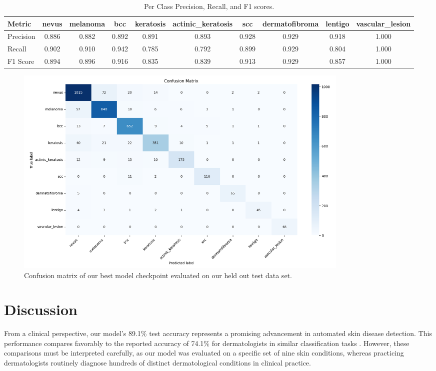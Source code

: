 \documentclass{article} %
\begin{document}
\begin{table}[H]
\caption{Per Class Precision, Recall, and F1 scores.}
\label{per-class-results}
\begin{center}
\scriptsize
\begin{tabular}{|l|c|c|c|c|c|c|c|c|c|}
\hline
\textbf{Metric} & \textbf{nevus} & \textbf{melanoma} & \textbf{bcc} & \textbf{keratosis} & \textbf{actinic\_keratosis} & \textbf{scc} & \textbf{dermatofibroma} & \textbf{lentigo} & \textbf{vascular\_lesion} \\
\hline
Precision & 0.886 & 0.882 & 0.892 & 0.891 & 0.893 & 0.928 & 0.929 & 0.918 & 1.000 \\
\hline
Recall & 0.902 & 0.910 & 0.942 & 0.785 & 0.792 & 0.899 & 0.929 & 0.804 & 1.000 \\
\hline
F1 Score & 0.894 & 0.896 & 0.916 & 0.835 & 0.839 & 0.913 & 0.929 & 0.857 & 1.000 \\
\hline
\end{tabular}
\end{center}
\end{table}

\begin{figure}[H]
\begin{center}
\includegraphics[width=0.8\textwidth]{Figs/test_confusion_matrix.png}
\end{center}
\caption{Confusion matrix of our best model checkpoint evaluated on our held out test data set.}
\end{figure}

\section{Discussion}

From a clinical perspective, our model's 89.1\% test accuracy represents a promising advancement in automated skin disease detection. This performance compares favorably to the reported accuracy of 74.1\% for dermatologists in similar classification tasks \citep{winkler2023assessment}. However, these comparisons must be interpreted carefully, as our model was evaluated on a specific set of nine skin conditions, whereas practicing dermatologists routinely diagnose hundreds of distinct dermatological conditions in clinical practice.
\end{document}
